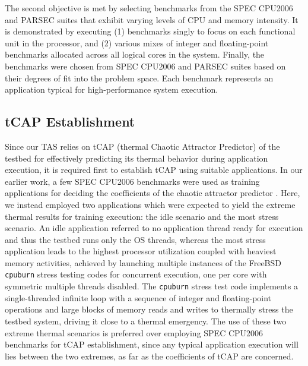 \documentclass[times, 10pt,twocolumn]{IEEEtran}
\begin{document}
The second objective is met by selecting benchmarks from the SPEC
CPU2006 and PARSEC suites that exhibit varying levels of CPU and memory
intensity.  It is demonstrated by executing (1) benchmarks singly to
focus on each functional unit in the processor, and (2) various mixes of
integer and floating-point benchmarks allocated across all logical cores
in the system.  Finally, the benchmarks were chosen from SPEC CPU2006
and PARSEC suites based on their degrees of fit into the problem space.
Each benchmark represents an application typical for high-performance
system execution.

\subsection{tCAP Establishment}
\label{sec:callibration}
Since our TAS relies on tCAP (thermal Chaotic Attractor Predictor) of
the testbed for effectively predicting its thermal behavior during
application execution, it is required first to establish tCAP using
suitable applications.  In our earlier work, a few SPEC CPU2006
benchmarks were used as training applications for deciding the
coefficients of the chaotic attractor predictor \cite{Lewis2010}.  Here,
we instead employed two applications which were expected to yield the
extreme thermal results for training execution: the idle scenario and
the most stress scenario.  An idle application referred to no
application thread ready for execution and thus the testbed runs only
the OS threads, whereas the most stress application leads to the highest
processor utilization coupled with heaviest memory activities, achieved
by launching multiple instances of the FreeBSD \texttt{cpuburn} stress
testing codes for concurrent execution, one per core with symmetric
multiple threads disabled.  The \texttt{cpuburn} stress test code
implements a single-threaded infinite loop with a sequence of integer
and floating-point operations and large blocks of memory reads and
writes to thermally stress the testbed system, driving it close to a
thermal emergency.  The use of these two extreme thermal scenarios is
preferred over employing SPEC CPU2006 benchmarks for tCAP establishment,
since any typical application execution will lies between the two
extremes, as far as the coefficients of tCAP are concerned.
\end{document}
